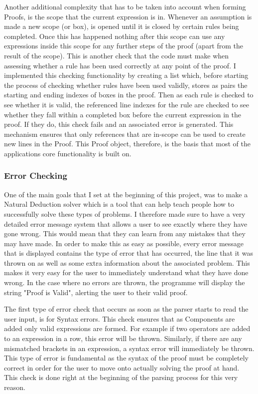 Another additional complexity that has to be taken into account when forming Proofs, is the scope that the current expression is in. Whenever an assumption is made a new scope (or box), is opened until it is closed by certain rules being completed. Once this has happened nothing after this scope can use any expressions inside this scope for any further steps of the proof (apart from the result of the scope). This is another check that the code must make when assessing whether a rule has been used correctly at any point of the proof. I implemented this checking functionality by creating a list which, before starting the process of checking whether rules have been used validly, stores as pairs the starting and ending indexes of boxes in the proof. Then as each rule is checked to see whether it is valid, the referenced line indexes for the rule are checked to see whether they fall within a completed box before the current expression in the proof. If they do, this check fails and an associated error is generated. This mechanism ensures that only references that are in-scope can be used to create new lines in the Proof. This Proof object, therefore, is the basis that most of the applications core functionality is built on.

\subsubsection{Error Checking}

One of the main goals that I set at the beginning of this project, was to make a Natural Deduction solver which is a tool that can help teach people how to successfully solve these types of problems. I therefore made sure to have a very detailed error message system that allows a user to see exactly where they have gone wrong. This would mean that they can learn from any mistakes that they may have made. In order to make this as easy as possible, every error message that is displayed contains the type of error that has occurred, the line that it was thrown on as well as some extra information about the associated problem. This makes it very easy for the user to immediately understand what they have done wrong. In the case where no errors are thrown, the programme will display the string "Proof is Valid", alerting the user to their valid proof. 

The first type of error check that occurs as soon as the parser starts to read the user input, is for Syntax errors. This check ensures that as Components are added only valid expressions are formed.  For example if two operators are added to an expression in a row, this error will be thrown. Similarly, if there are any mismatched brackets in an expression, a syntax error will immediately be thrown. This type of error is fundamental as the syntax of the proof must be completely correct in order for the user to move onto actually solving the proof at hand. This check is done right at the beginning of the parsing process for this very reason.

